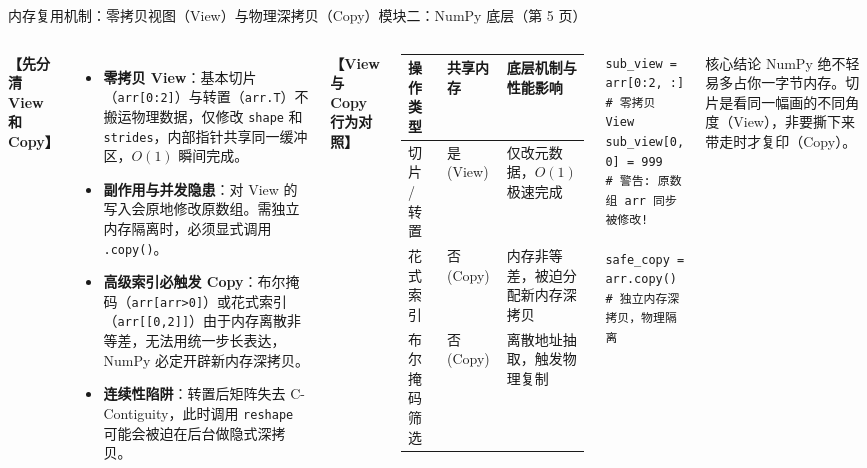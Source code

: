 \documentclass[aspectratio=169,9pt]{beamer}
\begin{document}
\begin{frame}[fragile]{内存复用机制：零拷贝视图（View）与物理深拷贝（Copy）}{模块二：NumPy 底层（第 5 页）}
\begin{columns}[T]
    \textbf{【先分清 View 和 Copy】}
    \begin{itemize}
        \item \textbf{零拷贝 View}：基本切片（\texttt{arr[0:2]}）与转置（\texttt{arr.T}）不搬运物理数据，仅修改 \texttt{shape} 和 \texttt{strides}，内部指针共享同一缓冲区，$O(1)$ 瞬间完成。
        \item \textbf{副作用与并发隐患}：对 View 的写入会原地修改原数组。需独立内存隔离时，必须显式调用 \texttt{.copy()}。
        \item \textbf{高级索引必触发 Copy}：布尔掩码（\texttt{arr[arr>0]}）或花式索引（\texttt{arr[[0,2]]}）由于内存离散非等差，无法用统一步长表达，NumPy 必定开辟新内存深拷贝。
        \item \textbf{连续性陷阱}：转置后矩阵失去 C-Contiguity，此时调用 \texttt{reshape} 可能会被迫在后台做隐式深拷贝。
    \end{itemize}

    \textbf{【View 与 Copy 行为对照】}
    \tiny
    \begin{tabular}{p{1.4cm}p{1.2cm}p{2.3cm}}
        \toprule
        \textbf{操作类型} & \textbf{共享内存} & \textbf{底层机制与性能影响} \\
        \midrule
        切片 / 转置 & 是 (View) & 仅改元数据，$O(1)$ 极速完成 \\
        花式索引 & 否 (Copy) & 内存非等差，被迫分配新内存深拷贝 \\
        布尔掩码筛选 & 否 (Copy) & 离散地址抽取，触发物理复制 \\
        \bottomrule
    \end{tabular}
    \vspace{2mm}
\begin{lstlisting}
sub_view = arr[0:2, :]  # 零拷贝 View
sub_view[0, 0] = 999     # 警告: 原数组 arr 同步被修改!

safe_copy = arr.copy()   # 独立内存深拷贝，物理隔离
\end{lstlisting}
    \begin{alertblock}{核心结论}
        \scriptsize NumPy 绝不轻易多占你一字节内存。切片是看同一幅画的不同角度（View），非要撕下来带走时才复印（Copy）。
    \end{alertblock}
\end{columns}
\end{frame}
\end{document}

